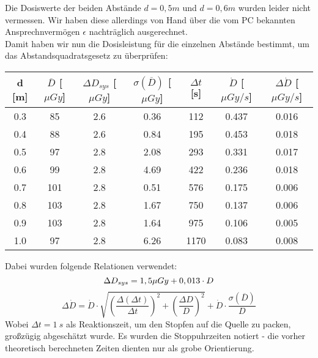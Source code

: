 \begin{center}
\begin{tabular}{c|c|c|c|c}
		\end{tabular}
        \label{dft:osl}
	\end{center}
\minipend
\vspace{5mm}

Die Dosiswerte der beiden Abstände $d = 0,5m$ und $d = 0,6m$ wurden leider nicht vermessen. Wir haben diese allerdings von Hand über die vom PC bekannten Ansprechnvermögen $\epsilon$ nachträglich ausgerechnet. \\
Damit haben wir nun die Dosisleistung für die einzelnen Abstände bestimmt, um das Abstandsquadratsgesetz zu überprüfen:

\minipanf
	\begin{center}	
		\begin{tabular}{c|c|c|c|c|c|c}
					d [m] & $\overline{D}$ [$\mu Gy$] & $\Delta D_{sys}$ [$\mu Gy$] & $\sigma(\overline{D})$ [$\mu Gy$] & $\Delta t$ [s] & $\dot{D}$ [$\mu Gy / s$] & $\Delta\dot{D}$ [$\mu Gy / s$] \\
		\hline	0.3 & 85 & 2.6 & 0.36 & 112 & 0.437 & 0.016 \\
				0.4	& 88 & 2.6 & 0.84 & 195 & 0.453 & 0.018 \\
				0.5 & 97 & 2.8 & 2.08 & 293 & 0.331 & 0.017 \\
			    0.6	& 99 & 2.8 & 4.69 & 422 & 0.236 & 0.018 \\
			    0.7 & 101 & 2.8 & 0.51 & 576 & 0.175 & 0.006 \\
			    0.8	& 103 & 2.8 & 1.67 & 750 & 0.137 & 0.006 \\
				0.9 & 103 & 2.8 & 1.64 & 975 & 0.106 & 0.005 \\
				1.0 & 97 & 2.8 & 6.26 & 1170 & 0.083 & 0.008				
		\end{tabular}
		\label{dft:Abstandsquadrat}
	\end{center}
\minipend
\vspace{3mm}

Dabei wurden folgende Relationen verwendet:
\begin{equation*}
	\Delta D_{sys} = 1,5 \mu Gy + 0,013 \cdot D \\
\end{equation*}
\begin{equation*}
	\Delta \dot{D} = \dot{D} \cdot \sqrt{\left(\frac{\Delta (\Delta t)}			{\Delta t}\right)^2 + \left(\frac{\Delta D}{D} \right)^2} + \dot{D} 			\cdot \frac{\sigma(\overline{D})}{D}
\end{equation*}
Wobei $\Delta t = 1\ s$ als Reaktionszeit, um den Stopfen auf die Quelle zu packen, großzügig abgeschätzt wurde. Es wurden die Stoppuhrzeiten notiert - die vorher theoretisch berechneten Zeiten dienten nur als grobe Orientierung.

